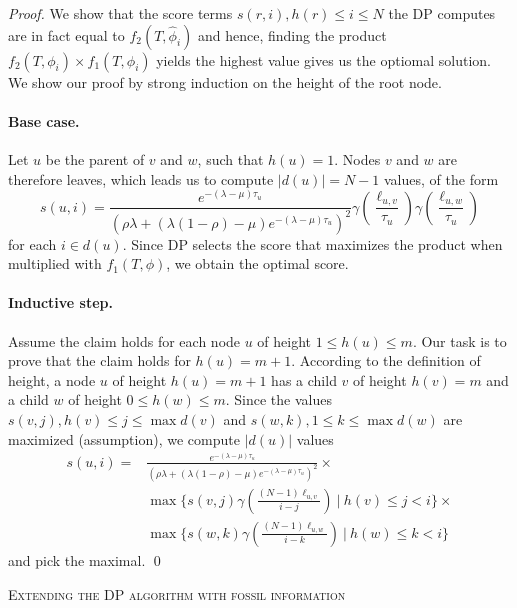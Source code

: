 \documentclass{llncs}
\renewcommand{\section}[1]{%
\bigskip
\begin{center}
\begin{Large}
\normalfont\scshape #1
\medskip
\end{Large}
\end{center}}
\begin{document}
\begin{proof}
We show that the score terms $s(r,i), h(r) \leq i \leq N$ the DP computes are
in fact equal to $f_2(T,\hat\phi_i)$ and hence, finding the product
$f_2(T,\phi_i)\times f_1(T,\phi_i)$ yields the highest value gives us the
optiomal solution. We show our proof by strong induction on the height of the
root node.
\paragraph{Base case.} Let $u$ be the parent of $v$ and $w$, such that $h(u) =
1$. Nodes $v$ and $w$ are therefore leaves, which leads us to compute
$|d(u)|=N-1$ values, of the form
%
%
$$
s(u,i) = \frac{e^{-(\lambda - \mu)\tau_u}}
              {(\rho\lambda + (\lambda(1 - \rho) - \mu)
                e^{-(\lambda-\mu)\tau_u})^2}
         \gamma(\frac{\ell_{u,v}}{\tau_u})
         \gamma(\frac{\ell_{u,w}}{\tau_u})
$$
%
%
for each $i \in d(u)$. Since DP selects the score that maximizes the product
when multiplied with $f_1(T,\phi)$, we obtain the optimal score.
\paragraph{Inductive step.} Assume the claim holds for each node $u$ of height
$1 \leq h(u) \leq m$. Our task is to prove that the claim holds for $h(u) =
m+1$.  According to the definition of height, a node $u$ of height $h(u)=m+1$
has a child $v$ of height $h(v)=m$ and a child $w$ of height $0 \leq h(w) \leq
m$.  Since the values $s(v,j), h(v) \leq j \leq \max d(v)$ and $s(w,k), 1 \leq
k \leq \max d(w)$ are maximized (assumption), we compute $|d(u)|$ values
%
%
\begin{equation*}
\begin{split}
s(u,i) = & \frac{e^{-(\lambda-\mu)\tau_u}}
                           {(\rho\lambda + 
                            (\lambda(1-\rho)-\mu)
                            e^{-(\lambda-\mu)\tau_u})^2}\times \\
         & \max\{ s(v,j)\gamma(\frac{(N-1)\ell_{u,v}}{i-j})\ |\ 
               h(v) \leq j < i\} \times \\
         & \max\{ s(w,k)\gamma(\frac{(N-1)\ell_{u,w}}{i-k})\ |\ 
               h(w) \leq k < i\}
\end{split}
\end{equation*}
%
%
and pick the maximal.
\qed\end{proof}

\section{Extending the DP algorithm with fossil information}
\end{document}
